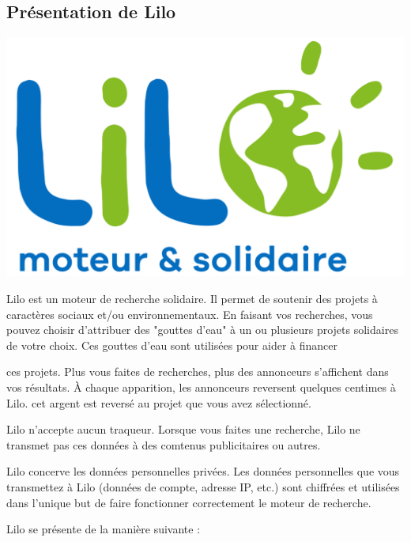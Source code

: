 \documentclass[12pt]{book}
\begin{document}
	\subsection{Présentation de Lilo}
		\hspace{-.8cm}
		\begin{minipage}[c]{.38\textwidth}
			\centering
			\includegraphics[width=.9\textwidth]{include/lilo_logo.png}
		\end{minipage}
		\begin{minipage}[c]{.62\textwidth}
		\hspace*{.4cm}
		Lilo est un moteur de recherche solidaire.
		Il permet de soutenir des projets à caractères sociaux et/ou environnementaux.
		En faisant vos recherches, vous pouvez choisir d'attribuer des "gouttes d'eau" à un ou plusieurs projets solidaires de votre choix.
		Ces gouttes d'eau sont utilisées pour aider à financer
		\end{minipage}
		ces projets.
		Plus vous faites de recherches, plus des annonceurs s'affichent dans vos résultats.
		À chaque apparition, les annonceurs reversent quelques centimes à Lilo.
		cet argent est reversé au projet que vous avez sélectionné.\par
		Lilo n'accepte aucun traqueur.
		Lorsque vous faites une recherche, Lilo ne transmet pas ces données à des comtenus publicitaires ou autres.\par
		Lilo concerve les données personnelles privées.
		Les données personnelles que vous transmettez à Lilo (données de compte, adresse IP, etc.) sont chiffrées et utilisées dans l'unique but de faire fonctionner correctement le moteur de recherche.\par
		Lilo se présente de la manière suivante :
\end{document}
